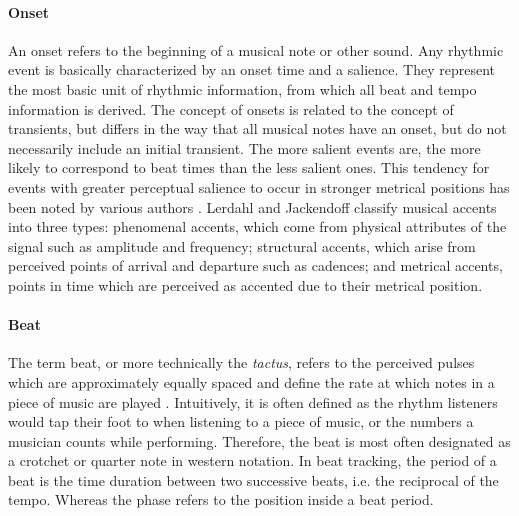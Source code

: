 \documentclass{scrartcl}
\begin{document}
\paragraph{Onset} 
An onset refers to the beginning of a musical note or other sound. Any rhythmic event is basically characterized by an onset time and a salience. They represent the most basic unit of rhythmic information, from which all beat and tempo information is derived. The concept of onsets is related to the concept of transients, but differs in the way that all musical notes have an onset, but do not necessarily include an initial transient. The more salient events are, the more likely to correspond to beat times than the less salient ones. This tendency for events with greater perceptual salience to occur in stronger metrical positions has been noted by various authors \cite{Lerdahl1985,Povel1985,Parncutt1994}. Lerdahl and Jackendoff \cite{Lerdahl1985} classify musical accents into three types: phenomenal accents, which come from physical attributes of the signal such as amplitude and frequency; structural accents, which arise from perceived points of arrival and departure such as cadences; and metrical accents, points in time which are perceived as accented due to their metrical position.


\paragraph{Beat} 
The term beat, or more technically the \emph{tactus}, refers to the perceived pulses which are approximately equally spaced and define the rate at which notes in a piece of music are played \cite{Handel1989}. Intuitively, it is often defined as the rhythm listeners would tap their foot to when listening to a piece of music, or the numbers a musician counts while performing. Therefore, the beat is most often designated as a crotchet or quarter note in western notation. In beat tracking, the period of a beat is the time duration between two successive beats, i.e. the reciprocal of the tempo. Whereas the phase refers to the position inside a beat period.  


\end{document}
